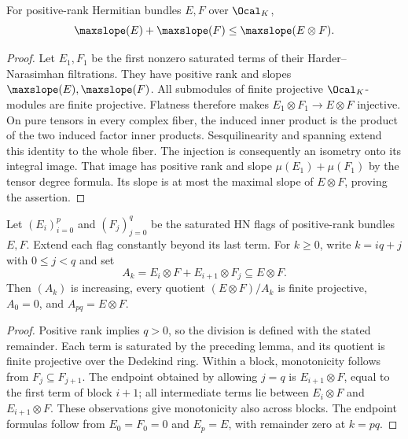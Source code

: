 \begin{lemma}
\label{lem:max-slope-tensor-lower}
\leanok
For positive-rank Hermitian bundles $E,F$ over $\Ocal_K$,
\[
 \maxslope(E)+\maxslope(F)\leq\maxslope(E\otimes F).
\]
\end{lemma}
\begin{proof}
Let $E_1,F_1$ be the first nonzero saturated terms of their
Harder--Narasimhan filtrations. They have positive rank and slopes
$\maxslope(E),\maxslope(F)$. All submodules of finite projective
$\Ocal_K$-modules are finite projective. Flatness therefore makes
$E_1\otimes F_1\to E\otimes F$ injective. On pure tensors in every
complex fiber, the induced inner product is the product of the two
induced factor inner products. Sesquilinearity and spanning extend this
identity to the whole fiber. The injection is consequently an isometry
onto its integral image. That image has positive rank and slope
$\mu(E_1)+\mu(F_1)$ by the tensor degree formula. Its slope is at most
the maximal slope of $E\otimes F$, proving the assertion.
\end{proof}

\begin{lemma}
\label{lem:hn-tensor-filtration}
\leanok
Let $(E_i)_{i=0}^p$ and $(F_j)_{j=0}^q$ be the saturated HN flags
of positive-rank bundles $E,F$. Extend each flag constantly beyond its
last term. For $k\geq0$, write $k=iq+j$ with $0\leq j<q$ and set
\[
 A_k=E_i\otimes F+E_{i+1}\otimes F_j\subseteq E\otimes F.
\]
Then $(A_k)$ is increasing, every quotient $(E\otimes F)/A_k$ is
finite projective, $A_0=0$, and $A_{pq}=E\otimes F$.
\end{lemma}
\begin{proof}
Positive rank implies $q>0$, so the division is defined with the
stated remainder. Each term is saturated by the preceding lemma,
and its quotient is finite projective over the Dedekind ring.
Within a block, monotonicity follows from $F_j\subseteq F_{j+1}$.
The endpoint obtained by allowing $j=q$ is $E_{i+1}\otimes F$, equal to the
first term of block $i+1$; all intermediate terms lie between
$E_i\otimes F$ and $E_{i+1}\otimes F$. These observations give
monotonicity also across blocks. The endpoint formulas follow from
$E_0=F_0=0$ and $E_p=E$, with remainder zero at $k=pq$.
\end{proof}

